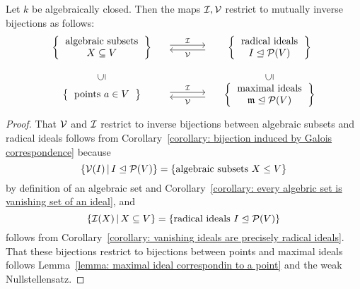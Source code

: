 \begin{proposition}
  Let $k$ be algebraically closed.
  Then the maps $\mathcal{I}, \mathcal{V}$ restrict to mutually inverse bijections as follows:
  \[
    \begin{matrix}
        \left\{
          \begin{tabular}{c}
              algebraic subsets \\
              $X \subseteq V$
          \end{tabular}
        \right\}
      & \begin{tikzcd}[column sep = large]
            {}
            \arrow[shift left]{r}{\mc{I}}
          & {}
            \arrow[shift left]{l}{\mc{V}}
        \end{tikzcd}
      & \left\{
          \begin{tabular}{c}
            radical ideals \\
            $I \idealeq \mc{P}(V)$
          \end{tabular}
        \right\}
      \\
        {}
      & {}
      & {}
      \\
        \rotatebox[origin=c]{90}{$\subseteq$}
      & {}
      & \rotatebox[origin=c]{90}{$\subseteq$}
      \\
        \left\{
          \begin{tabular}{c}
            points $a \in V$
          \end{tabular}
        \right\}
      & \begin{tikzcd}[column sep = large]
            {}
            \arrow[shift left]{r}{\mc{I}}
          & {}
            \arrow[shift left]{l}{\mc{V}}
        \end{tikzcd}
      & \left\{
          \begin{tabular}{c}
            maximal ideals \\
            $\mf{m} \idealeq \mc{P}(V)$
          \end{tabular}
        \right\}
    \end{matrix}
  \]
\end{proposition}


\begin{proof}
  That $\mathcal{V}$ and $\mathcal{I}$ restrict to inverse bijections between algebraic subsets and radical ideals follows from Corollary~\ref{corollary: bijection induced by Galois correspondence} because
  \[
      \{ \mc{V}(I) \suchthat I \idealeq \mc{P}(V) \}
    = \{ \text{algebraic subsets $X \leq V$} \}
  \]
  by definition of an algebraic set and Corollary~\ref{corollary: every algebric set is vanishing set of an ideal}, and
  \[
      \{ \mc{I}(X) \suchthat X \subseteq V \}
    = \{ \text{radical ideals $I \idealeq \mc{P}(V)$} \}
  \]
  follows from Corollary~\ref{corollary: vanishing ideals are precisely radical ideals}.
  That these bijections restrict to bijections between points and maximal ideals follows Lemma~\ref{lemma: maximal ideal correspondin to a point} and the weak Nullstellensatz.
\end{proof}



